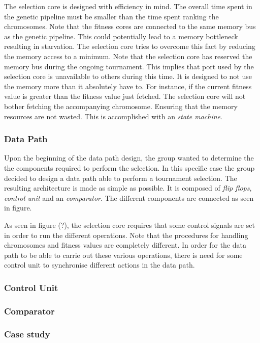 The selection core is designed with efficiency in mind.
The overall time spent in the genetic pipeline must be smaller than the time spent ranking the chromosomes.
Note that the fitness cores are connected to the same memory bus as the genetic pipeline.
This could potentially lead to a memory bottleneck resulting in starvation.
The selection core tries to overcome this fact by reducing the memory access to a minimum.
Note that the selection core has reserved the memory bus during the ongoing tournament.
This implies that port used by the selection core is unavailable to others during this time.
It is designed to not use the memory more than it absolutely have to.
For instance, if the current fitness value is greater than the fitness value just fetched.
The selection core will not bother fetching the accompanying chromosome.
Ensuring that the memory resources are not wasted.
This is accomplished with an \emph{state machine}. 



\subsubsection{Data Path}
Upon the beginning of the data path design, the group wanted to determine the the components required to perform the selection.
In this specific case the group decided to design a data path able to perform a tournament selection.
The resulting architecture is made as simple as possible.
It is composed of \emph{flip flops}, \emph{control unit} and an \emph{comparator}.
The different components are connected as seen in figure.

As seen in figure (?), the selection core requires that some control signals are set in order to run the different operations.
Note that the procedures for handling chromosomes and fitness values are completely different.
In order for the data path to be able to carrie out these various operations, there is need for some control unit to synchronise different actions in the data path. 





\subsubsection{Control Unit} \label{fpga:selection:sss:control_unit}



\subsubsection {Comparator} \label{fpga:selection:sss:comparator}



\subsubsection{Case study} \label{fpga:selection:sss:case_study}



